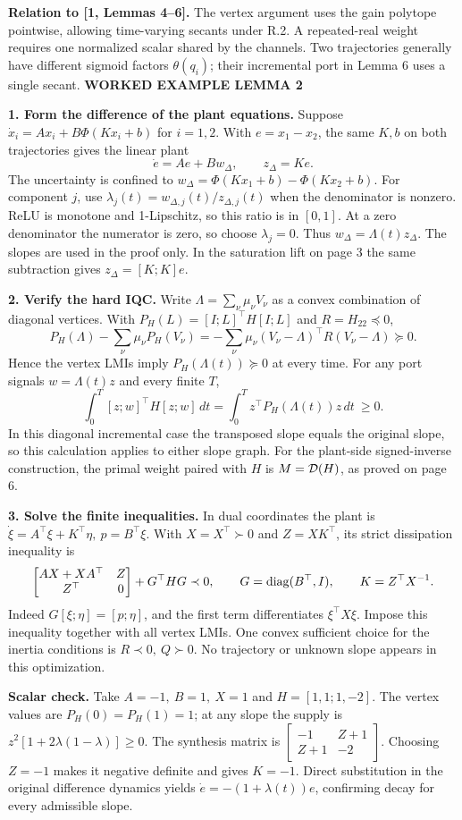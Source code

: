 \documentclass[11pt,a4paper]{article}
\newcommand{\topic}[2]{{\color{accent}\small\bfseries #1}\par\vspace{1mm}{\color{ink}\LARGE\bfseries #2}\par\vspace{2mm}}
\begin{document}
{\small\textbf{Relation to [1, Lemmas 4--6].} The vertex argument uses the gain polytope pointwise, allowing time-varying secants under R.2. A repeated-real weight requires one normalized scalar shared by the channels. Two trajectories generally have different sigmoid factors \(\theta(q_i)\); their incremental port in Lemma 6 uses a single secant.}
\newpage\normalsize
\topic{WORKED EXAMPLE \quad LEMMA 2}{From the linear port to the synthesis inequality}
\textbf{1. Form the difference of the plant equations.} Suppose
\(\dot x_i=Ax_i+B\Phi(Kx_i+b)\) for \(i=1,2\). With \(e=x_1-x_2\), the same \(K,b\) on both trajectories gives the linear plant
\[
 \dot e=Ae+B w_\Delta,\qquad z_\Delta=Ke .
\]
The uncertainty is confined to \(w_\Delta=\Phi(Kx_1+b)-\Phi(Kx_2+b)\).
For component \(j\), use \(\lambda_j(t)=w_{\Delta,j}(t)/z_{\Delta,j}(t)\) when the denominator is nonzero. ReLU is monotone and 1-Lipschitz, so this ratio is in \([0,1]\). At a zero denominator the numerator is zero, so choose \(\lambda_j=0\). Thus \(w_\Delta=\Lambda(t)z_\Delta\). The slopes are used in the proof only. In the saturation lift on page 3 the same subtraction gives \(z_\Delta=[K;K]e\).

\textbf{2. Verify the hard IQC.} Write \(\Lambda=\sum_\nu\mu_\nu V_\nu\) as a convex combination of diagonal vertices. With \(P_H(L)=[I;L]^\top H[I;L]\) and \(R=H_{22}\preceq0\),
\[
 P_H(\Lambda)-\sum_\nu\mu_\nu P_H(V_\nu)
 =-\sum_\nu\mu_\nu(V_\nu-\Lambda)^\top R(V_\nu-\Lambda)\succeq0.
\]
Hence the vertex LMIs imply \(P_H(\Lambda(t))\succeq0\) at every time. For any port signals \(w=\Lambda(t)z\) and every finite \(T\),
\[
 \int_0^T [z;w]^\top H[z;w]\,dt
 =\int_0^T z^\top P_H(\Lambda(t))z\,dt\ \ge0 .
\]
In this diagonal incremental case the transposed slope equals the original slope, so this calculation applies to either slope graph. For the plant-side signed-inverse construction, the primal weight paired with \(H\) is \(M=\mathcal D(H)\), as proved on page 6.

\textbf{3. Solve the finite inequalities.} In dual coordinates the plant is
\(\dot\xi=A^\top\xi+K^\top\eta,\ p=B^\top\xi\).
With \(X=X^\top\succ0\) and \(Z=XK^\top\), its strict dissipation inequality is
\[
 \begin{bmatrix}AX+XA^\top&Z\\Z^\top&0\end{bmatrix}
 +G^\top H G\prec0,\qquad
 G=\operatorname{diag}(B^\top,I),\qquad K=Z^\top X^{-1}.
\]
Indeed \(G[\xi;\eta]=[p;\eta]\), and the first term differentiates \(\xi^\top X\xi\). Impose this inequality together with all vertex LMIs. One convex sufficient choice for the inertia conditions is \(R\prec0,\ Q\succ0\). No trajectory or unknown slope appears in this optimization.

\textbf{Scalar check.} Take \(A=-1,\ B=1,\ X=1\) and \(H=[1,1;1,-2]\). The vertex values are \(P_H(0)=P_H(1)=1\); at any slope the supply is \(z^2[1+2\lambda(1-\lambda)]\ge0\). The synthesis matrix is
\(\left[\begin{smallmatrix}-1&Z+1\\Z+1&-2\end{smallmatrix}\right]\).
Choosing \(Z=-1\) makes it negative definite and gives \(K=-1\). Direct substitution in the original difference dynamics yields \(\dot e=-(1+\lambda(t))e\), confirming decay for every admissible slope.
\end{document}
